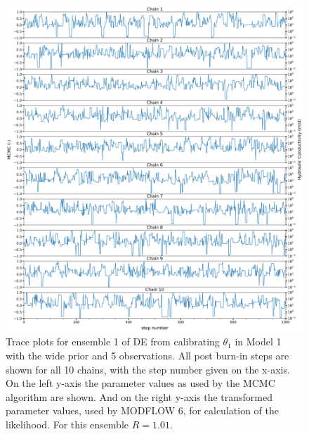 \begin{figure}[ht]
\centering
\includegraphics[width=1.0\textwidth]{Figures/appendix_figs/trace_plots_ensemble1_DE priorbroad.png}
\caption{Trace plots for ensemble 1 of DE from calibrating  $\theta_1$ in Model 1 with the wide prior and 5 observations. All post burn-in steps are shown for all 10 chains, with the step number given on the x-axis. On the left y-axis the parameter values as used by the MCMC algorithm are shown. And on the right y-axis the transformed parameter values, used by MODFLOW 6, for calculation of the likelihood. For this ensemble $\hat{R}=1.01$.}\label{traceplot_DE_priorbroad}
\end{figure}

